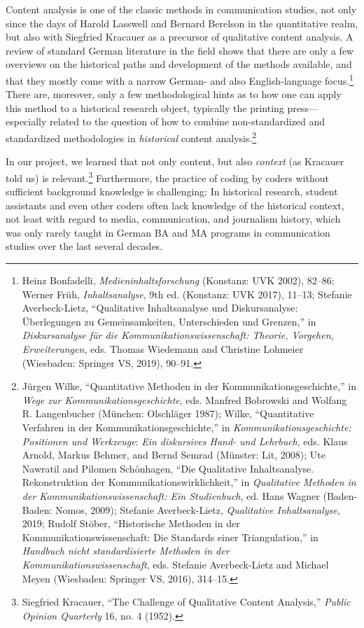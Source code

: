 \documentclass{tufte-handout}
\begin{document}
Content analysis is one of the classic methods in communication studies,
not only since the days of Harold Lasswell and Bernard Berelson in the
quantitative realm, but also with Siegfried Kracauer as a precursor of
qualitative content analysis. A review of standard German literature in
the field shows that there are only a few overviews on the historical
paths and development of the methods available, and that they mostly
come with a narrow German- and also English-language focus.\footnote{Heinz
  Bonfadelli, \emph{Medieninhaltsforschung} (Konstanz: UVK 2002),
  82--86; Werner Früh, \emph{Inhaltsanalyse}, 9th ed. (Konstanz: UVK
  2017), 11--13; Stefanie Averbeck-Lietz, ``Qualitative Inhaltsanalyse
  und Diskursanalyse: Überlegungen zu Gemeinsamkeiten, Unterschieden und
  Grenzen,'' in \emph{Diskursanalyse für die Kommunikationswissenschaft:
  Theorie, Vorgehen, Erweiterungen}, eds. Thomas Wiedemann and Christine
  Lohmeier (Wiesbaden: Springer VS, 2019), 90--91.} There are, moreover,
only a few methodological hints as to how one can apply this method to a
historical research object, typically the printing press---especially
related to the question of how to combine non-standardized and
standardized methodologies in \emph{historical} content
analysis.\footnote{Jürgen Wilke, ``Quantitative Methoden in der
  Kommunikationsgeschichte,'' in \emph{Wege zur
  Kommunikationsgeschichte}, eds. Manfred Bobrowski and Wolfang R.
  Langenbucher (München: Olschläger 1987); Wilke, ``Quantitative
  Verfahren in der Kommunikationsgeschichte,'' in
  \emph{Kommunikationsgeschichte: Positionen und Werkzeuge}: \emph{Ein
  diskursives Hand- und Lehrbuch}, eds. Klaus Arnold, Markus Behmer, and
  Bernd Semrad (Münster: Lit, 2008); Ute Nawratil and Pilomen
  Schönhagen, ``Die Qualitative Inhaltsanalyse. Rekonstruktion der
  Kommunikationswirklichkeit,'' in \emph{Qualitative Methoden in der
  Kommunikationswissenschaft: Ein Studienbuch}, ed. Hans Wagner
  (Baden-Baden: Nomos, 2009); Stefanie Averbeck-Lietz, \emph{Qualitative
  Inhaltsanalyse}, 2019; Rudolf Stöber, ``Historische Methoden in der
  Kommunikationswissenschaft: Die Standards einer Triangulation,'' in
  \emph{Handbuch nicht standardisierte Methoden in der
  Kommunikationswissenschaft}, eds. Stefanie Averbeck-Lietz and Michael
  Meyen (Wiesbaden: Springer VS, 2016), 314--15.}

In our project, we learned that not only content, but also
\emph{context} (as Kracauer told us) is relevant.\footnote{Siegfried
  Kracauer, ``The Challenge of Qualitative Content Analysis,''
  \emph{Public Opinion Quarterly} 16, no. 4 (1952).} Furthermore, the
practice of coding by coders without sufficient background knowledge is
challenging: In historical research, student assistants and even other
coders often lack knowledge of the historical context, not least with
regard to media, communication, and journalism history, which was only
rarely taught in German BA and MA programs in communication studies over
the last several decades.
\end{document}
